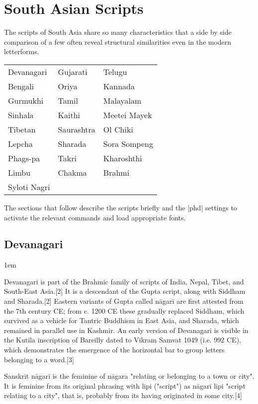 \arial


\section{South Asian Scripts}

The scripts of South Asia share so many characteristics that a side by side comparison of a few often reveal structural similarities even in the 
modern letterforms.
\medskip

\begin{center}
\begin{tabular}{lll}
Devanagari &Gujarati &Telugu\\
Bengali   &Oriya &Kannada\\
Gurmukhi &Tamil  &Malayalam\\
Sinhala &Kaithi  &Meetei Mayek\\
Tibetan &Saurashtra &Ol Chiki\\
Lepcha  &Sharada &Sora Sompeng\\
Phags-pa &Takri &Kharoshthi\\
Limbu &Chakma & Brahmi\\
Syloti Nagri & &\\
\end{tabular}
\end{center}

The sections that follow describe the scripts briefly and the |phd| settings
to activate the relevant commands and load appropriate fonts. 

\subsection{Devanagari}
\parindent1em

Devanagari is part of the Brahmic family of scripts of India, Nepal, Tibet, and South-East Asia.[2] It is a descendant of the Gupta script, along with Siddham and Sharada.[2] Eastern variants of Gupta called nāgarī are first attested from the 7th century CE; from c. 1200 CE these gradually replaced Siddham, which survived as a vehicle for Tantric Buddhism in East Asia, and Sharada, which remained in parallel use in Kashmir. An early version of Devanagari is visible in the Kutila inscription of Bareilly dated to Vikram Samvat 1049 (i.e. 992 CE), which demonstrates the emergence of the horizontal bar to group letters belonging to a word.[3]

Sanskrit nāgarī is the feminine of nāgara "relating or belonging to a town or city". It is feminine from its original phrasing with lipi ("script") as nāgarī lipi "script relating to a city", that is, probably from its having originated in some city.[4]


